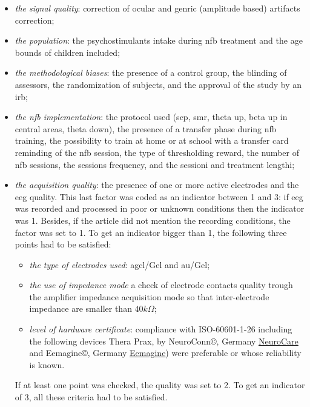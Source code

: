 \begin{itemize}
  \item \emph{the signal quality}: correction of ocular and genric (amplitude based) artifacts correction;
\item \emph{the population}: the psychostimulants intake during \gls{nfb} treatment and the age bounds of children
  included;
\item \emph{the methodological biases}: the presence of a control group, the blinding of assessors, 
the randomization of subjects, and the approval of the study by an \gls{irb};
\item \emph{the \gls{nfb} implementation}: the protocol used (\gls{scp}, \gls{smr}, 
theta up, beta up in central areas, theta down), the presence of a transfer phase during \gls{nfb} training, the possibility to train at home 
or at school with a transfer card reminding of the \gls{nfb} session, 
the type of thresholding reward, the number of \gls{nfb} sessions, the sessions frequency, and the sessioni and
treatment lengthi;
\item \emph{the acquisition quality}: the presence of one or more active electrodes and the \gls{eeg} quality. 
  This last factor was coded as an indicator between 1 and 3: if \gls{eeg} was recorded and processed in
  poor or unknown conditions then the indicator was 1. 
  Besides, if the article did not mention the recording conditions, the factor was set to 1. To get an indicator bigger than 1, the following three  
  points had to be satisfied:
\begin{itemize}
  \item \emph{the type of electrodes used}: \gls{agcl}/Gel and \gls{au}/Gel;
  \item \emph{the use of impedance mode} a check of electrode contacts quality trough the amplifier impedance
    acquisition mode so that inter-electrode impedance are smaller than $40k\Omega$;  
  \item \emph{level of hardware certificate}: compliance with ISO-60601-1-26\cite{} including the following devices Thera Prax\textregistered, by NeuroConn\copyright,
	Germany \href{https://www.neurocaregroup.com/neuroconn-thera-prax.html}{NeuroCare} and Eemagine\copyright, Germany
  \href{http://www.eemagine.com/}{Eemagine}) were preferable or 
  whose reliability is known.
\end{itemize}
 If at least one point was checked, the
quality was set to 2. To get an indicator of 3, all these criteria had to be satisfied.
\end{itemize}

